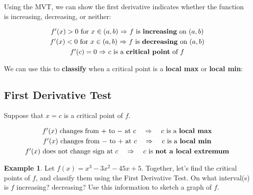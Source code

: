 \documentclass[11pt,reqno,final]{amsart}
\numberwithin{figure}{section}
\theoremstyle{definition} %
\newtheorem{example}[equation]{Example}%
\begin{document}
Using the MVT, we can show the first derivative indicates whether the function is increasing, decreasing, or neither:
\begin{framed}
        \begin{gather*}
                \mbox{$f'(x) > 0$ for $x \in (a,b)$ $\Rightarrow$ $f$ is \textbf{increasing} on $(a,b)$}\\
                \mbox{$f'(x) < 0$ for $x \in (a,b)$ $\Rightarrow$ $f$ is \textbf{decreasing} on $(a,b)$}\\
                \mbox{$f'(c) = 0$ $\Rightarrow$ $c$ is a \textbf{critical point} of $f$}                  
        \end{gather*}
\end{framed}


We can use this to \textbf{classify} when a critical point is a \textbf{local max} or \textbf{local min}:

\subsection*{First Derivative Test} Suppose that $x = c$ is a critical point of $f$.

\begin{framed}
        \begin{gather*}
                \mbox{$f'(x)$ changes from $+$ to $-$ at $c$ \quad $\Rightarrow$ \quad $c$ is a \textbf{local max}}\\
                \mbox{$f'(x)$ changes from $-$ to $+$ at $c$ \quad $\Rightarrow$ \quad $c$ is a \textbf{local min}}\\
                \mbox{$f'(x)$ does not change sign at $c$ \quad $\Rightarrow$ \quad $c$ is \textbf{not a local extremum}}
        \end{gather*}
\end{framed}

\newpage

\begin{example}
        Let $f(x) = x^3 - 3x^2 - 45x + 5$.
        Together, let's find the critical points of $f$, and classify them using the First Derivative Test.
        On what interval(s) is $f$ increasing? decreasing?
        Use this information to sketch a graph of $f$.
        \vfill
\end{example}
\end{document}
